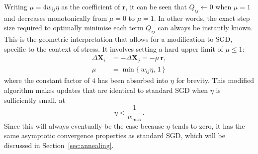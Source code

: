 Writing $\mu=4w_{ij}\eta$ as the coefficient of $\mathbf{r}$, it can be seen that $Q_{ij}\leftarrow 0$ when $\mu=1$ and decreases monotonically from $\mu=0$ to $\mu=1$.
In other words, the exact step size required to optimally minimise each term $Q_{ij}$ can always be instantly known. This is the geometric interpretation that allows for a modification to SGD, specific to the context of stress. It involves setting a hard upper limit of $\mu\leq 1$:
\begin{equation}
  \begin{aligned}
    \Delta\mathbf{X}_i &= -\Delta\mathbf{X}_j = -\mu\, \mathbf{r},\\
    \mu&=\min\{\,w_{ij}\eta, \, 1\,\}
  \end{aligned}
  \label{eq:mu}
\end{equation}
where the constant factor of $4$ has been absorbed into $\eta$ for brevity.
This modified algorithm makes updates that are identical to standard SGD when $\eta$ is sufficiently small, at
\begin{equation}
  \eta<\frac{1}{w_{\max}}.
  \label{eq:eta-sufficiently-small}
\end{equation}
Since this will always eventually be the case because $\eta$ tends to zero, it has the same asymptotic convergence properties as standard SGD, which will be discussed in Section~\ref{sec:annealing}.


